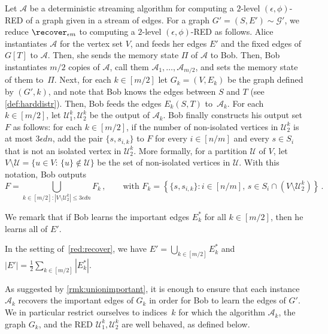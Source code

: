\begin{reduct}
	\label{red:recover}
	Let $\mathcal{A}$ be a deterministic streaming algorithm for computing a $2$-level $(\epsilon,\phi)$-RED of a graph given in a stream of edges. For a graph $G'=(S,E') \sim \mathcal{G}'$, we reduce $\recover_{\epsilon m}$ to computing a $2$-level $(\epsilon,\phi)$-RED as follows. Alice instantiates $\mathcal{A}$ for the vertex set $V$, and feeds her edges $E'$ and the fixed edges of $G[T]$ to $\mathcal{A}$. Then, she sends the memory state $\Pi$ of $\mathcal{A}$ to Bob. Then, Bob instantiates $m/2$ copies of $\mathcal{A}$, call them $\mathcal{A}_1, \dots, \mathcal{A}_{m/2}$, and sets the memory state of them to~$\Pi$. Next, for each $k \in [m/2]$ let $G_k = (V,E_k)$ be the graph defined by $(G',k)$, and note that Bob knows the edges between $S$ and $T$ (see \cref{def:harddistr}). Then, Bob feeds the edges $E_k(S,T)$ to~$\mathcal{A}_k$. For each $k \in [m/2]$, let $\mathcal{U}^k_1,\mathcal{U}^k_2$ be the output of $\mathcal{A}_k$. Bob finally constructs his output set $F$ as follows: for each $k \in [m/2]$, if the number of non-isolated vertices in $\mathcal{U}^k_2$ is at most $3 \epsilon d n$, add the pair $\{s,s_{i,k}\}$ to $F$ for every $i \in [n/m]$ and every $s \in S_i$ that is not an isolated vertex in $\mathcal{U}^k_2$. More formally, for a partition $\mathcal{U}$ of $V$, let $V \setminus \mathcal{U} = \{u \in V: \, \{u\} \notin \mathcal{U}\}$ be the set of non-isolated vertices in $\mathcal{U}$. With this notation, Bob outputs
	\begin{equation}
		\label{eq:boboutput}
		F = \bigcup_{k\in [m/2] : |V \setminus \mathcal{U}_2^k| \le 3\epsilon dn} F_k \, , \quad \quad \text{with } F_k=\left\{ \{s,s_{i,k}\} : i \in [n/m],\, s \in S_i \cap (V \setminus \mathcal{U}_2^k) \right\} \, .
	\end{equation} 
\end{reduct}
\noindent
We remark that if Bob learns the important edges $E^*_k$ for all $k \in [m/2]$, then he learns all of $E'$.
\begin{remark}
	\label{rmk:unionimportant}
	In the setting of~\cref{red:recover}, we have $E' = \bigcup_{k \in [m/2]} E^*_k$ and $|E'| = \frac{1}{2} \sum_{k \in [m/2]} |E^*_k|$.
\end{remark}
\noindent
As suggested by \cref{rmk:unionimportant}, it is enough to ensure that each instance $\mathcal{A}_k$ recovers the important edges of $G_k$ in order for Bob to learn the edges of $G'$. We in particular restrict ourselves to indices~$k$ for which the algorithm $\mathcal{A}_k$, the graph $G_k$, and the RED $\mathcal{U}_1^k,\mathcal{U}_2^k$ are well behaved, as defined below.

